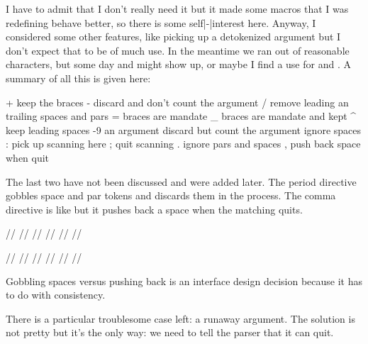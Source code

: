 \typebuffer[example][option=TEX] \startpacked \getbuffer[example] \stoppacked

I have to admit that I don't really need it but it made some macros that I was
redefining behave better, so there is some self|-|interest here. Anyway, I
considered some other features, like picking up a detokenized argument but I
don't expect that to be of much use. In the meantime we ran out of reasonable
characters, but some day  and \type {#!} might show up, or maybe I find
a use for \type {#<} and \type {#>}. A summary of all this is given here:

\starttabulate[|T|i2l|]
\FL
\NC +   \NC keep the braces \NC \NR
\NC -   \NC discard and don't count the argument \NC \NR
\NC /   \NC remove leading an trailing spaces and pars \NC \NR
\NC =   \NC braces are mandate \NC \NR
\NC _   \NC braces are mandate and kept \NC \NR
\NC ^   \NC keep leading spaces \NC \NR
\ML
{}-9 \NC an argument \NC \NR
{}   \NC discard but count the argument \NC \NR
\ML
\NC *   \NC ignore spaces \NC \NR
\NC :   \NC pick up scanning here  \NC \NR
\NC ;   \NC quit scanning \NC \NR
\ML
\NC .   \NC ignore pars and spaces \NC \NR
\NC ,   \NC push back space when quit \NC \NR
\LL
\stoptabulate

The last two have not been discussed and were added later. The period
directive gobbles space and par tokens and discards them in the
process. The comma directive is like \type {*} but it pushes back a space
when the matching quits.

\startbuffer
\tolerant{} %
\tolerant\def\FooB[#1]#,[#2]{(#1/#2)} %

/\FooA/ /\FooA / /\FooA[1]/ /\FooA[!] / /\FooA[1] [2]/ /\FooA[1] [2] /\par
/\FooB/ /\FooB / /\FooB[1]/ /\FooB[!] / /\FooB[1] [2]/ /\FooB[1] [2] /\par
\stopbuffer

\typebuffer[example][option=TEX] \startpacked \getbuffer[example] \stoppacked

Gobbling spaces versus pushing back is an interface design decision because it
has to do with consistency.

\stopsection

\startsection[title=Runaway arguments]

There is a particular troublesome case left: a runaway argument. The solution is
not pretty but it's the only way: we need to tell the parser that it can quit.

